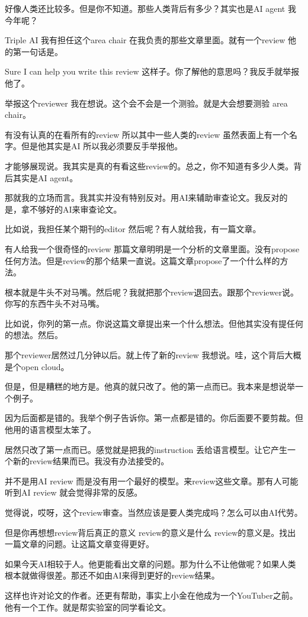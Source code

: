 \documentclass[12pt,a4paper]{article}
\begin{document}
好像人类还比较多。但是你不知道。那些人类背后有多少？其实也是AI agent 我今年呢？

Triple AI 我有担任这个area chair 在我负责的那些文章里面。就有一个review 他的第一句话是。

Sure I can help you write this review 这样子。你了解他的意思吗？我反手就举报他了。

举报这个reviewer 我在想说。这个会不会是一个测验。就是大会想要测验 area chair。

有没有认真的在看所有的review 所以其中一些人类的review 虽然表面上有一个名字。但是他其实是AI 所以我必须要反手举报他。

才能够展现说。我其实是真的有看这些review的。总之，你不知道有多少人类。背后其实是AI agent。

那就我的立场而言。我其实并没有特别反对。用AI来辅助审查论文。我反对的是，拿不够好的AI来审查论文。

比如说，我担任某个期刊的editor 然后呢？有人就给我，有一篇文章。

有人给我一个很奇怪的review 那篇文章明明是一个分析的文章里面。没有propose任何方法。但是review的那个结果一直说。这篇文章propose了一个什么样的方法。

根本就是牛头不对马嘴。然后呢？我就把那个review退回去。跟那个reviewer说。你写的东西牛头不对马嘴。

比如说，你列的第一点。你说这篇文章提出来一个什么想法。但他其实没有提任何的想法。然后。

那个reviewer居然过几分钟以后。就上传了新的review 我想说。哇，这个背后大概是个open cloud。

但是，但是糟糕的地方是。他真的就只改了。他的第一点而已。我本来是想说举一个例子。

因为后面都是错的。我举个例子告诉你。第一点都是错的。你后面要不要剪裁。但他用的语言模型太笨了。

居然只改了第一点而已。感觉就是把我的instruction 丢给语言模型。让它产生一个新的review结果而已。我没有办法接受的。

并不是用AI review 而是没有用一个最好的模型。来review这些文章。那有人可能听到AI review 就会觉得非常的反感。

觉得说，哎呀，这个review审查。当然应该是要人类完成吗？怎么可以由AI代劳。

但是你再想想review背后真正的意义 review的意义是什么 review的意义是。找出一篇文章的问题。让这篇文章变得更好。

如果今天AI相较于人。他更能看出文章的问题。那为什么不让他做呢？如果人类根本就做得很差。那还不如由AI来得到更好的review结果。

这样也许对论文的作者。还更有帮助，事实上小金在他成为一个YouTuber之前。他有一个工作。就是帮实验室的同学看论文。
\end{document}
